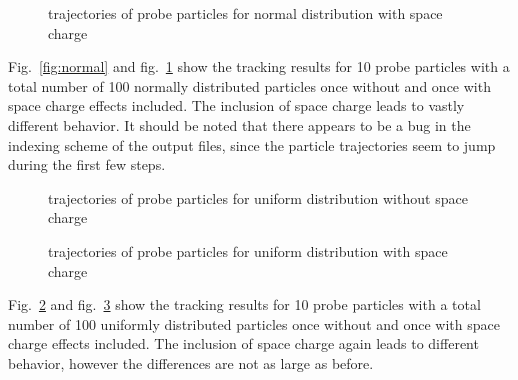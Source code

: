 \begin{center}
\begin{figure}[H]
  
  \caption{trajectories of probe particles for normal distribution with space charge}
  \label{fig:normal_spch}
\end{figure}
\end{center}

Fig.~\ref{fig:normal} and fig.~\ref{fig:normal_spch} show the tracking results for 10 probe particles with a total number of 100 normally distributed particles once without and once with space charge effects included. The inclusion of space charge leads to vastly different behavior. It should be noted that there appears to be a bug in the indexing scheme of the output files, since the particle trajectories seem to jump during the first few steps.

\begin{center}
\begin{figure}[H]
  
  \caption{trajectories of probe particles for uniform distribution without space charge}
  \label{fig:uniform}
\end{figure}
\end{center}

\begin{center}
\begin{figure}[H]
  
  \caption{trajectories of probe particles for uniform distribution with space charge}
  \label{fig:uniform_spch}
\end{figure}
\end{center}

Fig.~\ref{fig:uniform} and fig.~\ref{fig:uniform_spch} show the tracking results for 10 probe particles with a total number of 100 uniformly distributed particles once without and once with space charge effects included. The inclusion of space charge again leads to different behavior, however the differences are not as large as before.
